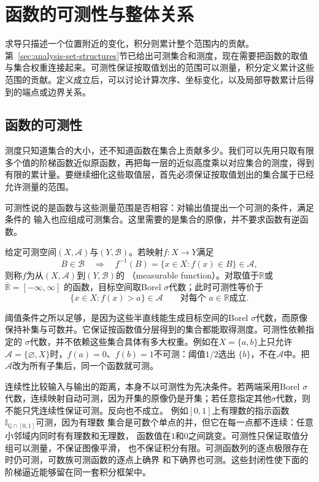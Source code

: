 \section{函数的可测性与整体关系}
\label{sec:analysis-integration-average}

求导只描述一个位置附近的变化，积分则累计整个范围内的贡献。第~\ref{sec:analysis-set-structures}节已给出可测集合和测度，现在需要把函数的取值与集合权重连接起来。可测性保证按取值划出的范围可以测量，积分定义累计这些范围的贡献。定义成立后，可以讨论计算次序、坐标变化，以及局部导数累计后得到的端点或边界关系。

\subsection{函数的可测性}

测度只知道集合的大小，还不知道函数在集合上贡献多少。我们可以先用只取有限多个值的阶梯函数近似原函数，再把每一层的近似高度乘以对应集合的测度，得到有限的累计量。要继续细化这些取值层，首先必须保证按取值划出的集合属于已经允许测量的范围。

可测性说的是函数与这些测量范围是否相容：对输出值提出一个可测的条件，满足条件的
输入也应组成可测集合。这里需要的是集合的原像，并不要求函数有逆函数。
\begin{definition}[可测函数]
\label{def:analysis-measurable-function}
给定可测空间$(X,\mathcal{A})$与$(Y,\mathcal{B})$。若映射$f:X\to Y$满足
\[
  B\in\mathcal{B}\quad\Longrightarrow\quad
  f^{-1}(B)=\{x\in X:f(x)\in B\}\in\mathcal{A},
\]
则称$f$为从$(X,\mathcal{A})$到$(Y,\mathcal{B})$的
（measurable function）。对取值于$\mathbb{R}$或$\overline{\mathbb{R}}=[-\infty,\infty]$
的函数，目标空间取Borel $\sigma$代数；此时可测性等价于
\[
  \{x\in X:f(x)>a\}\in\mathcal{A}
  \qquad\text{对每个 }a\in\mathbb{R}\text{成立}.
\]
\end{definition}
阈值条件之所以足够，是因为这些半直线能生成目标空间的Borel $\sigma$代数，而原像
保持补集与可数并。它保证按函数值分层得到的集合都能取得测度。可测性依赖指定的
$\sigma$代数，并不依赖这些集合具体有多大权重。例如在$X=\{a,b\}$上只允许
$\mathcal{A}=\{\varnothing,X\}$时，$f(a)=0$、$f(b)=1$不可测：阈值$1/2$选出
$\{b\}$，不在$\mathcal{A}$中。把$\mathcal{A}$改为所有子集后，同一个函数就可测。

连续性比较输入与输出的距离，本身不以可测性为先决条件。若两端采用Borel $\sigma$代数，连续映射自动可测，因为开集的原像仍是开集；若任意指定其他$\sigma$代数，则不能只凭连续性保证可测。反向也不成立。
例如$[0,1]$上有理数的指示函数$\mathbb{I}_{\mathbb{Q}\cap[0,1]}$可测，因为有理数
集合是可数个单点的并，但它在每一点都不连续：任意小邻域内同时有有理数和无理数，
函数值在$1$和$0$之间跳变。可测性只保证取值分组可以测量，不保证图像平滑，
也不保证积分有限。可测函数列的逐点极限存在时仍可测，可数族可测函数的逐点上确界
和下确界也可测。这些封闭性使下面的阶梯逼近能够留在同一套积分框架中。

